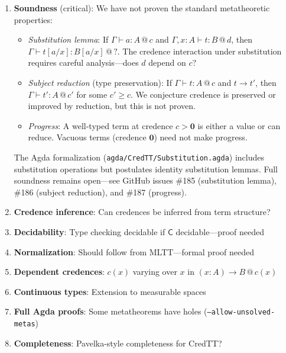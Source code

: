 \documentclass[11pt,a4paper]{article}
\makeatletter
\newcommand{\C}{\mathsf{C}}
\newcommand{\at}[1]{\,@\,#1}
\newcommand{\zero}{\mathbf{0}}
\makeatother
\begin{document}
\begin{enumerate}
    \item \textbf{Soundness} (critical): We have not proven the standard metatheoretic properties:
    \begin{itemize}
        \item \emph{Substitution lemma}: If $\Gamma \vdash a : A \at{c}$ and $\Gamma, x : A \vdash t : B \at{d}$, then $\Gamma \vdash t[a/x] : B[a/x] \at{?}$. The credence interaction under substitution requires careful analysis---does $d$ depend on $c$?
        \item \emph{Subject reduction} (type preservation): If $\Gamma \vdash t : A \at{c}$ and $t \to t'$, then $\Gamma \vdash t' : A \at{c'}$ for some $c' \geq c$. We conjecture credence is preserved or improved by reduction, but this is not proven.
        \item \emph{Progress}: A well-typed term at credence $c > \zero$ is either a value or can reduce. Vacuous terms (credence $\zero$) need not make progress.
    \end{itemize}
    The Agda formalization (\texttt{agda/CredTT/Substitution.agda}) includes substitution operations but postulates identity substitution lemmas. Full soundness remains open---see GitHub issues \#185 (substitution lemma), \#186 (subject reduction), and \#187 (progress).

    \item \textbf{Credence inference}: Can credences be inferred from term structure?
    \item \textbf{Decidability}: Type checking decidable if $\C$ decidable---proof needed
    \item \textbf{Normalization}: Should follow from MLTT---formal proof needed
    \item \textbf{Dependent credences}: $c(x)$ varying over $x$ in $(x : A) \to B \at{c(x)}$
    \item \textbf{Continuous types}: Extension to measurable spaces
    \item \textbf{Full Agda proofs}: Some metatheorems have holes (\texttt{--allow-unsolved-metas})
    \item \textbf{Completeness}: Pavelka-style completeness for CredTT?
\end{enumerate}



\end{document}
